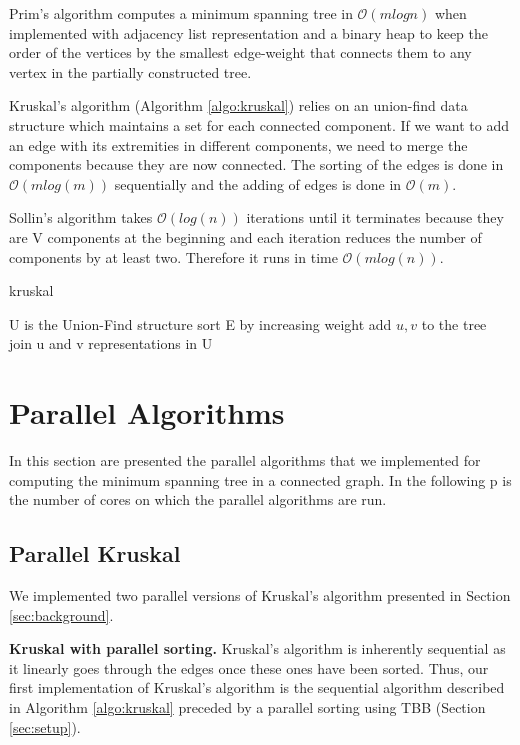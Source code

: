 \documentclass[letterpaper]{article}
\newcommand{\mypar}[1]{{\bf #1.}}
\begin{document}
Prim's algorithm computes a minimum spanning tree in $\mathcal{O}(mlogn)$ when implemented with adjacency list representation and a binary heap to keep the order of the vertices by the smallest edge-weight that connects them to any vertex in the partially constructed tree.

Kruskal's algorithm (Algorithm \ref{algo:kruskal}) relies on an union-find data structure which maintains a set for each connected component. If we want to add an edge with its extremities in different components, we need to merge the components because they are now connected. The sorting of the edges is done in $\mathcal{O}(mlog(m))$ sequentially and the adding of edges is done in $\mathcal{O}(m)$.

Sollin's algorithm takes $\mathcal{O}(log(n))$ iterations until it terminates because they are V components at the beginning and each iteration reduces the number of components by at least two. Therefore it runs in time $\mathcal{O}(mlog(n))$.

\begin{algorithm}
\caption{kruskal}
\label{algo:kruskal}
\begin{algorithmic}
\State U is the Union-Find structure
\State sort E by increasing weight
        \State add ${u,v}$ to the tree
        \State join u and v representations in U
    \EndIf
\EndFor

\end{algorithmic}
\end{algorithm}


\section{Parallel Algorithms}\label{sec:algo}

In this section are presented the parallel algorithms that we implemented for computing the minimum spanning tree in a connected graph.
In the following p is the number of cores on which the parallel algorithms are run.

\subsection{Parallel Kruskal} \label{sec:parKruskal}

We implemented two parallel versions of Kruskal's algorithm presented in Section \ref{sec:background}.

\mypar{Kruskal with parallel sorting} Kruskal's algorithm is inherently sequential as it linearly goes through the edges once these ones have been sorted. Thus, our first implementation of Kruskal's algorithm is the sequential algorithm described in Algorithm \ref{algo:kruskal} preceded by a parallel sorting using TBB (Section \ref{sec:setup}).
\end{document}
